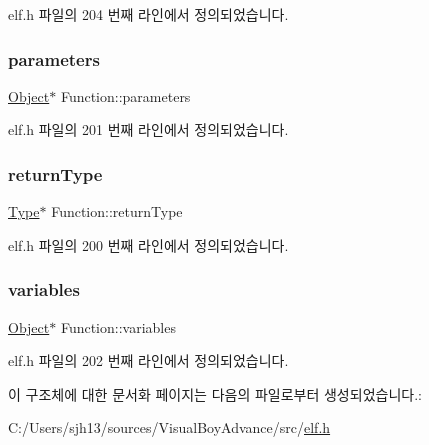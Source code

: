 elf.\+h 파일의 204 번째 라인에서 정의되었습니다.

\mbox{\label{struct_function_a54c66e528d60629f16233e5690e46863}} 
\subsubsection{\texorpdfstring{parameters}{parameters}}
{\footnotesize\ttfamily \mbox{\hyperlink{struct_object}{Object}}$\ast$ Function\+::parameters}



elf.\+h 파일의 201 번째 라인에서 정의되었습니다.

\mbox{\label{struct_function_ac0e42dfc7467e114a2a55005bd5549e2}} 
\subsubsection{\texorpdfstring{return\+Type}{returnType}}
{\footnotesize\ttfamily \mbox{\hyperlink{struct_type}{Type}}$\ast$ Function\+::return\+Type}



elf.\+h 파일의 200 번째 라인에서 정의되었습니다.

\mbox{\label{struct_function_af68017d9a2b267a45154499c26ee981d}} 
\subsubsection{\texorpdfstring{variables}{variables}}
{\footnotesize\ttfamily \mbox{\hyperlink{struct_object}{Object}}$\ast$ Function\+::variables}



elf.\+h 파일의 202 번째 라인에서 정의되었습니다.



이 구조체에 대한 문서화 페이지는 다음의 파일로부터 생성되었습니다.\+:\begin{DoxyCompactItemize}
\item 
C\+:/\+Users/sjh13/sources/\+Visual\+Boy\+Advance/src/\mbox{\hyperlink{elf_8h}{elf.\+h}}\end{DoxyCompactItemize}
